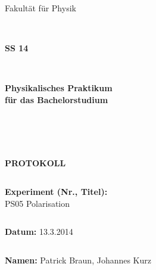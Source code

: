 \documentclass[12pt,a4paper]{article}
\begin{document}
\thispagestyle{empty}
			\begin{center}
			\Large{Fakultät für Physik}\\
			\end{center}
\begin{verbatim}


\end{verbatim}
			\begin{center}
			\textbf{\LARGE SS 14}
			\end{center}
\begin{verbatim}


\end{verbatim}
			\begin{center}
			\textbf{\LARGE{Physikalisches Praktikum\\ für das Bachelorstudium}}
			\end{center}
\begin{verbatim}




\end{verbatim}

			\begin{center}
			\textbf{\LARGE{PROTOKOLL}}
			\end{center}
			
\begin{verbatim}

\end{verbatim}

			\begin{flushleft}
			\textbf{\Large{Experiment (Nr., Titel):}}\\
			\LARGE{PS05 Polarisation}	
			\end{flushleft}

\begin{verbatim}

\end{verbatim}	
			\begin{flushleft}
			\textbf{\Large{Datum:}} \Large{13.3.2014}
			\end{flushleft}
			
\begin{verbatim}
\end{verbatim}
		\begin{flushleft}
			\textbf{\Large{Namen:}} \Large{Patrick Braun, Johannes Kurz}
			\end{flushleft}
\end{document}
